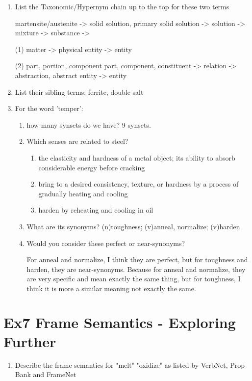 \documentclass[12pt]{article}
\begin{document}
{\begin{enumerate}[1.]
	martensite: a solid solution of carbon in alpha-iron that is formed when steel is cooled so rapidly that 
	the change from austenite to pearlite is suppressed; responsible for the hardness of quenched steel.

	austenite: a solid solution of ferric carbide or carbon in iron; cools to form pearlite or martensite.
	\item List the Taxonomic/Hypernym chain up to the top for these two terms
	
	martensite/austenite -> solid solution, primary solid solution -> solution -> mixture -> substance ->

	(1) matter -> physical entity -> entity

	(2) part, portion, component part, component, constituent -> relation -> abstraction, abstract entity -> entity

	\item List their sibling terms: 
	ferrite, double salt
	\item For the word 'temper': 
	\begin{enumerate}[(1)]
		\item how many synsets do we have? 9 synsets. 
		\item Which senses are related to steel? 
			\begin{enumerate}[1*]
				\item the elasticity and hardness of a metal object; 
				its ability to absorb considerable energy before cracking
				\item bring to a desired consistency, texture, or hardness by a process of gradually heating and cooling
				\item harden by reheating and cooling in oil
			\end{enumerate}
		\item What are its synonyms? (n)toughness; (v)anneal, normalize; (v)harden
		\item Would you consider these perfect or near-synonyms? 
		
		For anneal and normalize, I think they are perfect, but for toughness and harden, they are near-synonyms. 
		Because for anneal and normalize, they are very specific and mean exactly the same thing, but for toughness, 
		I think it is more a similar meaning not exactly the same.
	\end{enumerate}
\end{enumerate}

\newpage
\section{Ex7 Frame Semantics - Exploring Further}
\label{sec: ex7}
\begin{enumerate}[1.]
	\item Describe the frame semantics for "melt" "oxidize" as listed by VerbNet, Prop-Bank and FrameNet
		

\end{enumerate}}
\end{document}
